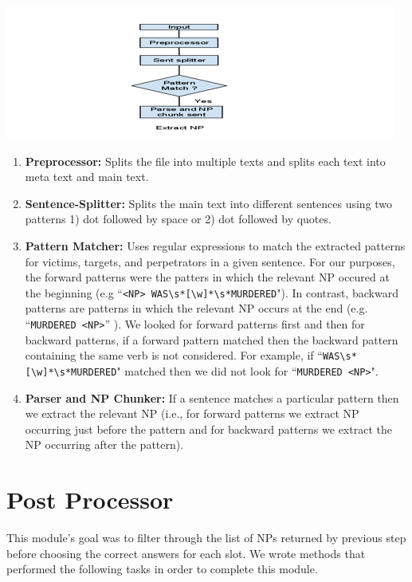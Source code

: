 \documentclass[11pt]{myclass}
\begin{document}
\includegraphics[scale=0.75]{patt.png}

\begin{enumerate}

\item \textbf{Preprocessor:} Splits the file into multiple texts and splits each text into meta text and main text. 
\item \textbf{Sentence-Splitter:} Splits the main text into different sentences using two patterns 1) dot followed by space or 2) dot followed by quotes.
\item \textbf{Pattern Matcher:} Uses regular expressions to match the extracted patterns for victims, targets, and perpetrators in a given sentence. For our purposes, the forward patterns were the patters in which the relevant NP occured at the beginning (e.g ``\texttt{<NP> WAS\textbackslash s*[\textbackslash w]*\textbackslash s*MURDERED}"). In contrast, backward patterns are patterns in which the relevant NP occurs at the end (e.g. ``\texttt{MURDERED <NP>}” ). We looked for forward patterns first and then for backward patterns, if a forward pattern matched then the backward pattern containing the same verb is not considered. For example, if  ``\texttt{WAS\textbackslash s*[\textbackslash w]*\textbackslash s*MURDERED}" matched then we did not look for ``\texttt{MURDERED <NP>}".
\item \textbf{Parser and NP Chunker:} If a sentence matches a particular pattern then we extract the relevant NP (i.e., for forward patterns we extract NP occurring just before the pattern and for backward patterns we extract the NP occurring after the pattern).

\end{enumerate}


\section*{Post Processor}

This module’s goal was to filter through the list of NPs returned by previous step before choosing the correct answers for each slot. We wrote methods that performed the following tasks in order to complete this module. 
\end{document}
